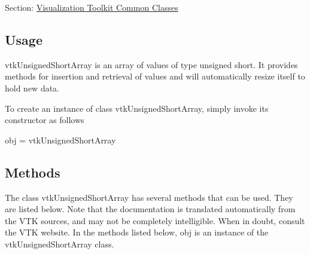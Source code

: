 Section\-: \hyperlink{sec_vtkcommon}{Visualization Toolkit Common Classes} \hypertarget{vtkwidgets_vtkxyplotwidget_Usage}{}\subsection{Usage}\label{vtkwidgets_vtkxyplotwidget_Usage}
vtk\-Unsigned\-Short\-Array is an array of values of type unsigned short. It provides methods for insertion and retrieval of values and will automatically resize itself to hold new data.

To create an instance of class vtk\-Unsigned\-Short\-Array, simply invoke its constructor as follows \begin{DoxyVerb}  obj = vtkUnsignedShortArray
\end{DoxyVerb}
 \hypertarget{vtkwidgets_vtkxyplotwidget_Methods}{}\subsection{Methods}\label{vtkwidgets_vtkxyplotwidget_Methods}
The class vtk\-Unsigned\-Short\-Array has several methods that can be used. They are listed below. Note that the documentation is translated automatically from the V\-T\-K sources, and may not be completely intelligible. When in doubt, consult the V\-T\-K website. In the methods listed below, {\ttfamily obj} is an instance of the vtk\-Unsigned\-Short\-Array class. 
